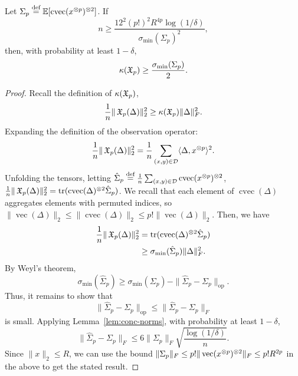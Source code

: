 \documentclass[tablecaption=bottom]{jmlr}
\newcommand\eqdef{\ensuremath{\stackrel{\textrm{def}}{=}}} %
\newcommand\sD{\ensuremath{\mathcal{D}}}
\newcommand\sigmamin{\sigma_\textrm{min}}
\newcommand\reflem[1]{Lemma~\ref{lem:#1}}
\newcommand{\Lop}{\textrm{op}}
\DeclareMathOperator{\cvec} {cvec}
\DeclareMathOperator{\vvec} {vec}
\begin{document}
\begin{lemma}
\label{lem:lowRankLower}
Let $\Sigma_p \eqdef \E[\cvec(x\tp{p})\tp{2}]$.
If $$n \ge \frac{12^2 (p!)^2 R^{4p} \log(1/\delta)}{\sigmamin(\Sigma_p)^2},$$
then, with probability at least $1-\delta$,
$$\kappa(\opX_p) \ge \frac{\sigmamin(\Sigma_p)}{2}.$$
\end{lemma}

\begin{proof}
  Recall the definition of $\kappa(\operatorname{\mathfrak{X}}_p)$, 
  $$\frac{1}{n} \|\operatorname{\mathfrak{X}}_p(\Delta)\|_2^2 \ge \kappa(\operatorname{\mathfrak{X}}_p) \|\Delta\|^2_F.$$
Expanding the definition of the observation operator:
$$\frac{1}{n} \|\opX_p(\Delta)\|_2^2 = \frac{1}{n} \sum_{(x,y) \in \sD} \innerp{\Delta}{x\tp{p}}^2.$$
Unfolding the tensors, letting $\hat\Sigma_p \eqdef \frac{1}{n}
\sum_{(x,y) \in \sD} \cvec(x\tp{p})\tp{2}$, $\frac{1}{n}
\|\opX_p(\Delta)\|_2^2 = \trace(\cvec(\Delta)\tp{2} \hat\Sigma_p)$. 
We recall that each element of $\cvec(\Delta)$ aggregates elements with
permuted indices, so $\|\vvec(\Delta)\|_2 \le \|\cvec(\Delta)\|_2 \le p!
\|\vvec(\Delta)\|_2$. Then, we have 
\begin{align}
\frac{1}{n} \|\opX_p(\Delta)\|_2^2 
  &= \trace(\cvec(\Delta)\tp{2} \hat\Sigma_p) \\
  &\ge \sigmamin(\hat\Sigma_p) \|\Delta\|_F^2 .
\end{align}
By Weyl's theorem, $$\sigmamin(\hat\Sigma_p) \ge
\sigmamin(\Sigma_p) - \|\hat\Sigma_p - \Sigma_p\|_\Lop.$$ Thus, it
remains to show that $$\|\hat\Sigma_p - \Sigma_p\|_\Lop \le
\|\hat\Sigma_p - \Sigma_p\|_{F}$$ is small. Applying \reflem{conc-norms}, with
probability at least $1 - \delta$, $$\| \hat\Sigma_p - \Sigma_p \|_F
\le 6 \|\Sigma_p\|_F \sqrt{\frac{\log(1/\delta)}{n}}.$$ Since $\|x\|_2 \le R$, we can use the
bound $\| \Sigma_p \|_F \le p! \| \vvec(x\tp{p})\tp{2} \|_F \le p!
R^{2p}$ in the above to get the stated result. 

\end{proof}
\end{document}
